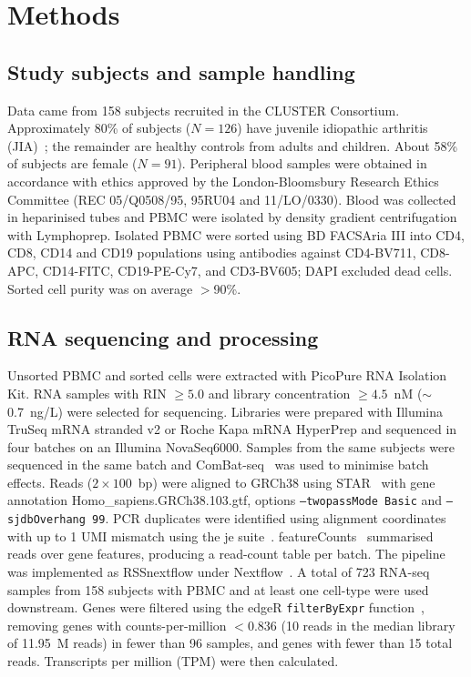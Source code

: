 \documentclass[11pt]{article}
\begin{document}
\section{Methods}
\subsection{Study subjects and sample handling}
Data came from 158 subjects recruited in the CLUSTER Consortium. Approximately 80\% of subjects ($N=126$) have juvenile idiopathic arthritis (JIA)~\citep{petty2012jia}; the remainder are healthy controls from adults and children. About 58\% of subjects are female ($N=91$). Peripheral blood samples were obtained in accordance with ethics approved by the London-Bloomsbury Research Ethics Committee (REC 05/Q0508/95, 95RU04 and 11/LO/0330). Blood was collected in heparinised tubes and PBMC were isolated by density gradient centrifugation with Lymphoprep. Isolated PBMC were sorted using BD FACSAria III into CD4, CD8, CD14 and CD19 populations using antibodies against CD4-BV711, CD8-APC, CD14-FITC, CD19-PE-Cy7, and CD3-BV605; DAPI excluded dead cells. Sorted cell purity was on average $>$90\%.

\subsection{RNA sequencing and processing}
Unsorted PBMC and sorted cells were extracted with PicoPure RNA Isolation Kit. RNA samples with RIN $\geq 5.0$ and library concentration $\geq 4.5$~nM ($\sim$0.7~ng/\textmu L) were selected for sequencing. Libraries were prepared with Illumina TruSeq mRNA stranded v2 or Roche Kapa mRNA HyperPrep and sequenced in four batches on an Illumina NovaSeq6000. Samples from the same subjects were sequenced in the same batch and ComBat-seq~\citep{zhang2020combatseq} was used to minimise batch effects. Reads ($2\times100$~bp) were aligned to GRCh38 using STAR~\citep{dobin2013star} with gene annotation Homo\_sapiens.GRCh38.103.gtf, options \texttt{--twopassMode Basic} and \texttt{--sjdbOverhang 99}. PCR duplicates were identified using alignment coordinates with up to 1 UMI mismatch using the je suite~\citep{girardot2016je}. featureCounts~\citep{liao2014featurecounts} summarised reads over gene features, producing a read-count table per batch. The pipeline was implemented as RSSnextflow under Nextflow~\citep{di2017nextflow}. A total of 723 RNA-seq samples from 158 subjects with PBMC and at least one cell-type were used downstream. Genes were filtered using the edgeR \texttt{filterByExpr} function~\citep{robinson2010edger,chen2016filterbyexpr}, removing genes with counts-per-million $<0.836$ (10 reads in the median library of 11.95~M reads) in fewer than 96 samples, and genes with fewer than 15 total reads. Transcripts per million (TPM) were then calculated.
\end{document}
